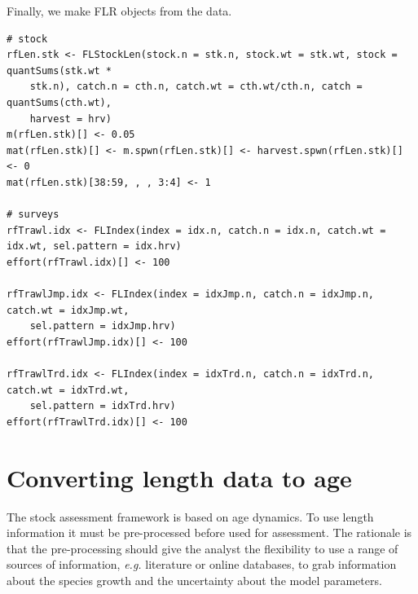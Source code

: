 \documentclass[a4paper,english,10pt]{article}\usepackage[]{graphicx}\usepackage[]{color}
\makeatletter
\newenvironment{kframe}{%
 \def\at@end@of@kframe{}%
 \ifinner\ifhmode%
  \def\at@end@of@kframe{\end{minipage}}%
  \begin{minipage}{\columnwidth}%
 \fi\fi%
 \def\FrameCommand##1{\hskip\@totalleftmargin \hskip-\fboxsep
 \colorbox{shadecolor}{##1}\hskip-\fboxsep
     \hskip-\linewidth \hskip-\@totalleftmargin \hskip\columnwidth}%
 \MakeFramed {\advance\hsize-\width
   \@totalleftmargin\z@ \linewidth\hsize
   \@setminipage}}%
 {\par\unskip\endMakeFramed%
 \at@end@of@kframe}
\newenvironment{knitrout}{}{} %
\makeatother
\begin{document}



Finally, we make FLR objects from the data.

\begin{knitrout}
\color{fgcolor}\begin{kframe}
\begin{verbatim}
# stock
rfLen.stk <- FLStockLen(stock.n = stk.n, stock.wt = stk.wt, stock = quantSums(stk.wt * 
    stk.n), catch.n = cth.n, catch.wt = cth.wt/cth.n, catch = quantSums(cth.wt), 
    harvest = hrv)
m(rfLen.stk)[] <- 0.05
mat(rfLen.stk)[] <- m.spwn(rfLen.stk)[] <- harvest.spwn(rfLen.stk)[] <- 0
mat(rfLen.stk)[38:59, , , 3:4] <- 1

# surveys
rfTrawl.idx <- FLIndex(index = idx.n, catch.n = idx.n, catch.wt = idx.wt, sel.pattern = idx.hrv)
effort(rfTrawl.idx)[] <- 100

rfTrawlJmp.idx <- FLIndex(index = idxJmp.n, catch.n = idxJmp.n, catch.wt = idxJmp.wt, 
    sel.pattern = idxJmp.hrv)
effort(rfTrawlJmp.idx)[] <- 100

rfTrawlTrd.idx <- FLIndex(index = idxTrd.n, catch.n = idxTrd.n, catch.wt = idxTrd.wt, 
    sel.pattern = idxTrd.hrv)
effort(rfTrawlTrd.idx)[] <- 100
\end{verbatim}
\end{kframe}
\end{knitrout}


\pagebreak
\section{Converting length data to age}

The stock assessment framework is based on age dynamics. To use length information it must be pre-processed before used for assessment. The rationale is that the pre-processing should give the analyst the flexibility to use a range of sources of information, \emph{e.g.} literature or online databases, to grab information about the species growth and the uncertainty about the model parameters.
\end{document}
